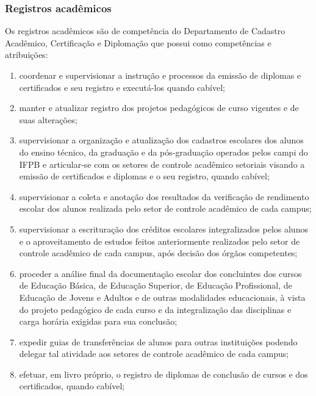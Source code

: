 \subsubsection{Registros acad\^emicos}

Os registros acadêmicos são de competência do Departamento de Cadastro Acadêmico, Certificação e Diplomação que possui como competências e atribuições:

\begin{enumerate}
\item coordenar e supervisionar a instrução e processos da emissão de diplomas e certificados e seu registro e executá-los quando cabível;

\item manter e atualizar registro dos projetos pedagógicos de curso vigentes e de suas alterações;

\item supervisionar a organização e atualização dos cadastros escolares dos alunos do ensino técnico, da graduação e da pós-graduação operados pelos campi do IFPB e articular-se com os setores de controle acadêmico setoriais visando a emissão de certificados e diplomas e o seu registro, quando cabível;

\item supervisionar a coleta e anotação dos resultados da verificação de rendimento escolar dos alunos realizada pelo setor de controle acadêmico de cada campus;

\item supervisionar a escrituração dos créditos escolares integralizados pelos alunos e o aproveitamento de estudos feitos anteriormente realizados pelo setor de controle acadêmico de cada campus, após decisão dos órgãos competentes;

\item proceder a análise final da documentação escolar dos concluintes dos cursos de Educação Básica, de Educação Superior, de Educação Profissional, de Educação de Jovens e Adultos e de outras modalidades educacionais, à vista do projeto pedagógico de cada curso e da integralização das disciplinas e carga horária exigidas para sua conclusão;

\item expedir guias de transferências de alunos para outras instituições podendo delegar tal atividade aos setores de controle acadêmico de cada campus;

\item efetuar, em livro próprio, o registro de diplomas de conclusão de cursos e dos certificados, quando cabível; 


\end{enumerate}
